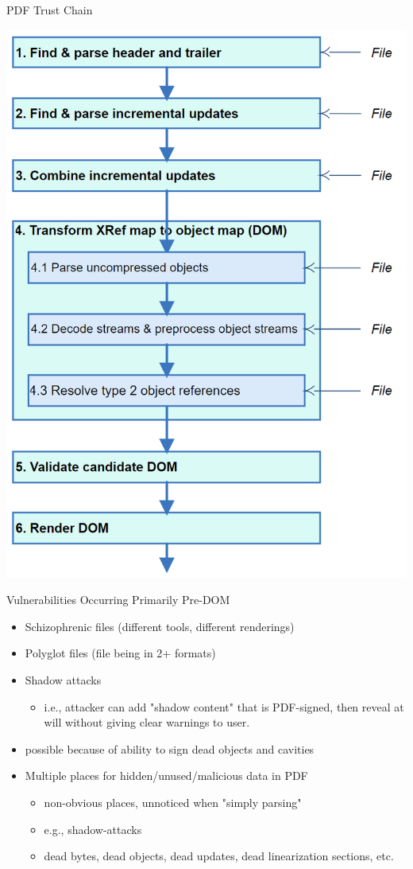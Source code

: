 \documentclass[t,10pt,xcolor={dvipsnames}]{beamer}
\begin{document}
\begin{frame}[label={sec:org3daab85}]{PDF Trust Chain}
\begin{center}
\includegraphics[width=0.47\linewidth]{../figures/Stages.png}
\end{center}
\end{frame}

\begin{frame}[label={sec:orgc8262a8}]{Vulnerabilities Occurring Primarily Pre-DOM}
\begin{itemize}
\item Schizophrenic files (different tools, different renderings)
\item Polyglot files (file being in 2+ formats)
\item Shadow attacks
\begin{itemize}
\item i.e., attacker can add "shadow content" that is PDF-signed, then reveal
at will without giving clear warnings to user.
\end{itemize}
\end{itemize}

\begin{itemize}
\item possible because of ability to sign \alert{dead objects} and \alert{cavities}
\end{itemize}
\begin{itemize}
\item Multiple places for hidden/unused/malicious data in PDF
\begin{itemize}
\item non-obvious places, unnoticed when "simply parsing"
\item e.g., shadow-attacks
\item dead bytes, dead objects, dead updates, dead linearization sections, etc.
\end{itemize}
\end{itemize}
\end{frame}
\end{document}

